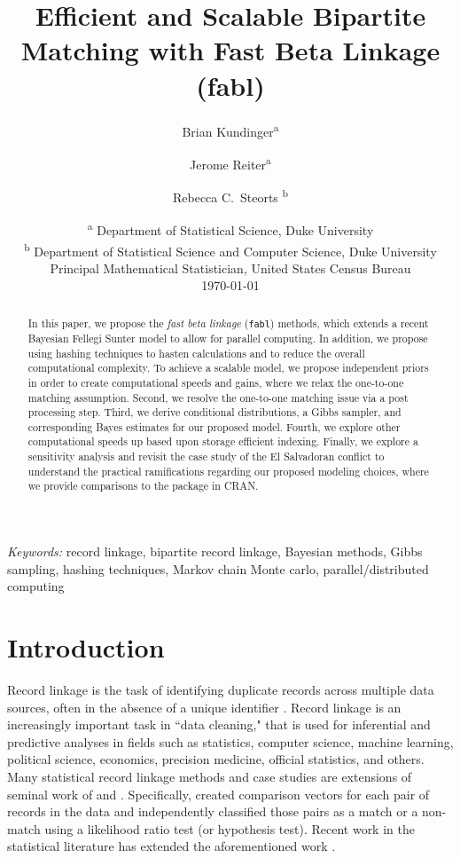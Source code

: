 \documentclass[12pt,letterpaper]{article}
\title{Efficient and Scalable Bipartite Matching with Fast Beta Linkage  (fabl)}
\author{Brian Kundinger\textsuperscript{a} \and
  Jerome Reiter\textsuperscript{a} \and 
  Rebecca C.~Steorts \textsuperscript{b}}
\date{
 \textsuperscript{a} Department of Statistical Science, Duke University \\
 \textsuperscript{b} Department of Statistical Science and Computer Science, Duke University\\Principal Mathematical Statistician, United States Census Bureau\\[2ex]
  \today}
\newcommand{\1}[1]{\mathbb{I}\!\left[#1\right]} %
\def\spacingset#1{\renewcommand{\baselinestretch}%
  {#1}\small\normalsize} \spacingset{1}
\begin{document}
\maketitle

\bigskip
\begin{abstract}
In this paper, we propose the \emph{fast beta linkage} (\texttt{fabl}) methods, which extends a recent Bayesian Fellegi Sunter model to allow for parallel computing. In addition, we propose using hashing techniques to hasten calculations and to reduce the overall computational complexity. To achieve a scalable model, we propose independent priors in order to create computational speeds and gains, where we relax the one-to-one matching assumption. Second, we resolve the one-to-one matching issue via a post processing step. Third, we derive conditional distributions, a Gibbs sampler, and corresponding Bayes estimates for our proposed model. Fourth, we explore other computational speeds up based upon storage efficient indexing. Finally, we explore a sensitivity analysis and revisit the case study of the El Salvadoran conflict to understand the practical ramifications regarding our proposed modeling choices, where we provide comparisons to the  package in CRAN. 
\end{abstract}


\noindent%
{\it Keywords:} record linkage, bipartite record linkage, Bayesian methods, Gibbs sampling, hashing techniques, Markov chain Monte carlo, parallel/distributed computing

\newpage
\spacingset{1.5}

\section{Introduction}
\label{sec:introduction}



Record linkage is the task of identifying duplicate records across multiple data sources, often in the absence of a unique identifier \citep{christen_2012}. Record linkage is an increasingly important task in ``data cleaning," that is used for inferential and predictive analyses in fields such as statistics, computer science, machine learning, political science, economics, precision medicine, official statistics, and others. Many statistical record linkage methods and case studies are extensions of seminal work of \cite{fellegi_theory_1969} and \cite{newcombe_automatic_1959}. Specifically, \cite{fellegi_theory_1969} created comparison vectors for each pair of records in the data and independently classified those pairs as a match or a non-match using a likelihood ratio test (or hypothesis test). Recent work in the statistical literature has extended the aforementioned work \citep{winkler1991application, fair2004generalized, wagner2014person, gill2003english}. 
\end{document}
